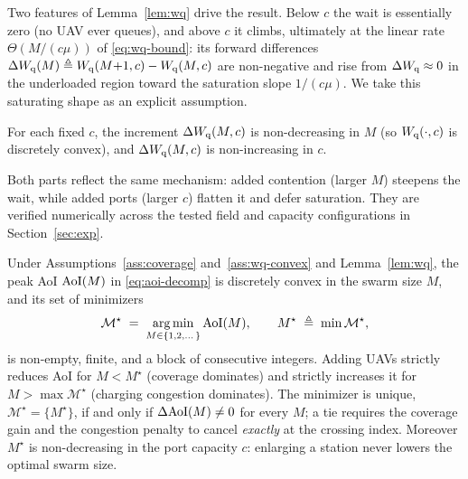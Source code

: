 \noindent
Two features of Lemma~\ref{lem:wq} drive the result. Below $c$ the wait is
essentially zero (no UAV ever queues), and above $c$ it climbs, ultimately at the
linear rate $\Theta(M/(c\mu))$ of \eqref{eq:wq-bound}: its forward differences
$\Delta W_{\mathrm q}(M)\triangleq W_{\mathrm q}(M{+}1,c)-W_{\mathrm q}(M,c)$ are non-negative and rise from
$\Delta W_{\mathrm q}\approx0$ in the underloaded region toward the saturation slope
$1/(c\mu)$. We take this saturating shape as an explicit assumption.

\begin{assumption}
\label{ass:wq-convex}
For each fixed $c$, the increment $\Delta W_{\mathrm q}(M,c)$ is non-decreasing in $M$ (so
$W_{\mathrm q}(\cdot,c)$ is discretely convex), and $\Delta W_{\mathrm q}(M,c)$ is non-increasing in
$c$.
\end{assumption}

\noindent
Both parts reflect the same mechanism: added contention (larger $M$) steepens the
wait, while added ports (larger $c$) flatten it and defer saturation. They are
verified numerically across the tested field and capacity configurations in
Section~\ref{sec:exp}.

\begin{proposition}
\label{prop:ushape}
Under Assumptions~\ref{ass:coverage} and~\ref{ass:wq-convex} and
Lemma~\ref{lem:wq}, the peak AoI $\mathrm{AoI}(M)$ in \eqref{eq:aoi-decomp} is discretely
convex in the swarm size $M$, and its set of minimizers
\begin{equation}
\mathcal{M}^\star \;=\; \operatorname*{arg\,min}_{M\in\{1,2,\dots\}} \mathrm{AoI}(M),
\qquad M^\star \;\triangleq\; \min\mathcal{M}^\star ,
\end{equation}
is non-empty, finite, and a block of consecutive integers. Adding UAVs strictly
reduces AoI for $M<M^\star$ (coverage dominates) and strictly increases it for
$M>\max\mathcal{M}^\star$ (charging congestion dominates). The minimizer is
unique, $\mathcal{M}^\star=\{M^\star\}$, if and only if $\Delta\mathrm{AoI}(M)\neq0$ for
every $M$; a tie requires the coverage gain and the congestion penalty to cancel
\emph{exactly} at the crossing index. Moreover $M^\star$ is non-decreasing in the
port capacity $c$: enlarging a station never lowers the optimal swarm size.
\end{proposition}

